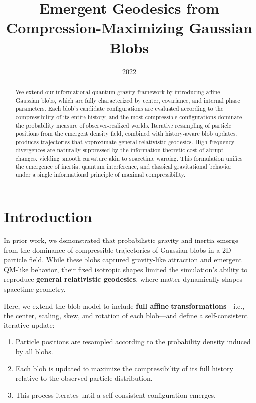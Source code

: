 \documentclass[11pt]{article}
\title{Emergent Geodesics from Compression-Maximizing Gaussian Blobs}
\date{2022}
\begin{document}
\maketitle

\begin{abstract}
We extend our informational quantum-gravity framework by introducing affine Gaussian blobs, 
which are fully characterized by center, covariance, and internal phase parameters. 
Each blob’s candidate configurations are evaluated according to the compressibility of its entire history, 
and the most compressible configurations dominate the probability measure of observer-realized worlds. 
Iterative resampling of particle positions from the emergent density field, combined with history-aware blob updates, 
produces trajectories that approximate general-relativistic geodesics. High-frequency divergences are naturally 
suppressed by the information-theoretic cost of abrupt changes, yielding smooth curvature akin to spacetime warping. 
This formulation unifies the emergence of inertia, quantum interference, and classical gravitational behavior 
under a single informational principle of maximal compressibility.
\end{abstract}


\section{Introduction}
In prior work, we demonstrated that probabilistic gravity and inertia emerge from the dominance of compressible trajectories of Gaussian blobs in a 2D particle field. While these blobs captured gravity-like attraction and emergent QM-like behavior, their fixed isotropic shapes limited the simulation’s ability to reproduce \textbf{general relativistic geodesics}, where matter dynamically shapes spacetime geometry.

Here, we extend the blob model to include \textbf{full affine transformations}---i.e., the center, scaling, skew, and rotation of each blob---and define a self-consistent iterative update:
\begin{enumerate}
    \item Particle positions are resampled according to the probability density induced by all blobs.
    \item Each blob is updated to maximize the compressibility of its full history relative to the observed particle distribution.
    \item This process iterates until a self-consistent configuration emerges.
\end{enumerate}
\end{document}
